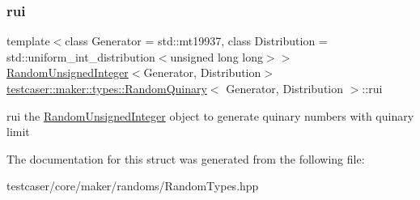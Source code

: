 \subsubsection{\texorpdfstring{rui}{rui}}
{\footnotesize\ttfamily template$<$class Generator = std\+::mt19937, class Distribution = std\+::uniform\+\_\+int\+\_\+distribution$<$unsigned long long$>$$>$ \\
\mbox{\hyperlink{classtestcaser_1_1maker_1_1types_1_1RandomUnsignedInteger}{Random\+Unsigned\+Integer}}$<$Generator, Distribution$>$ \mbox{\hyperlink{structtestcaser_1_1maker_1_1types_1_1RandomQuinary}{testcaser\+::maker\+::types\+::\+Random\+Quinary}}$<$ Generator, Distribution $>$\+::rui}



rui the \mbox{\hyperlink{classtestcaser_1_1maker_1_1types_1_1RandomUnsignedInteger}{Random\+Unsigned\+Integer}} object to generate quinary numbers with quinary limit 



The documentation for this struct was generated from the following file\+:\begin{DoxyCompactItemize}
\item 
testcaser/core/maker/randoms/Random\+Types.\+hpp\end{DoxyCompactItemize}
